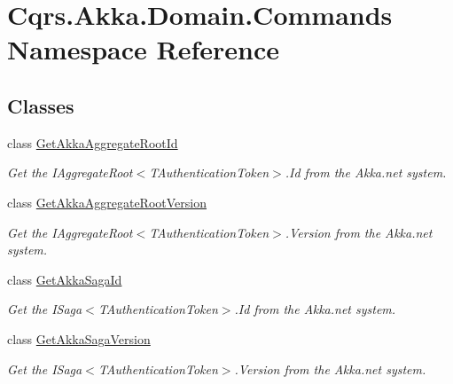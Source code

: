 \hypertarget{namespaceCqrs_1_1Akka_1_1Domain_1_1Commands}{}\section{Cqrs.\+Akka.\+Domain.\+Commands Namespace Reference}
\label{namespaceCqrs_1_1Akka_1_1Domain_1_1Commands}
\subsection*{Classes}
\begin{DoxyCompactItemize}
\item 
class \hyperlink{classCqrs_1_1Akka_1_1Domain_1_1Commands_1_1GetAkkaAggregateRootId}{Get\+Akka\+Aggregate\+Root\+Id}
\begin{DoxyCompactList}\small\item\em Get the I\+Aggregate\+Root$<$\+T\+Authentication\+Token$>$.\+Id from the Akka.\+net system. \end{DoxyCompactList}\item 
class \hyperlink{classCqrs_1_1Akka_1_1Domain_1_1Commands_1_1GetAkkaAggregateRootVersion}{Get\+Akka\+Aggregate\+Root\+Version}
\begin{DoxyCompactList}\small\item\em Get the I\+Aggregate\+Root$<$\+T\+Authentication\+Token$>$.\+Version from the Akka.\+net system. \end{DoxyCompactList}\item 
class \hyperlink{classCqrs_1_1Akka_1_1Domain_1_1Commands_1_1GetAkkaSagaId}{Get\+Akka\+Saga\+Id}
\begin{DoxyCompactList}\small\item\em Get the I\+Saga$<$\+T\+Authentication\+Token$>$.\+Id from the Akka.\+net system. \end{DoxyCompactList}\item 
class \hyperlink{classCqrs_1_1Akka_1_1Domain_1_1Commands_1_1GetAkkaSagaVersion}{Get\+Akka\+Saga\+Version}
\begin{DoxyCompactList}\small\item\em Get the I\+Saga$<$\+T\+Authentication\+Token$>$.\+Version from the Akka.\+net system. \end{DoxyCompactList}\end{DoxyCompactItemize}

